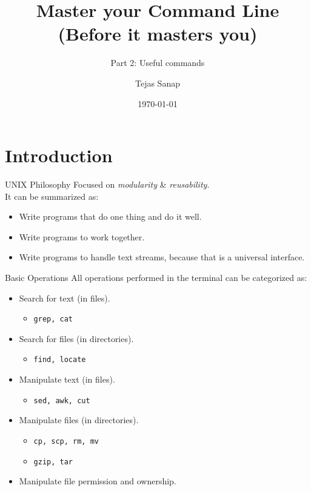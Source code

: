 \documentclass[11pt]{beamer}
\title[PLUG Meetup]{Master your Command Line \\ \small{(Before it masters you)} }
\subtitle{\large{Part 2: Useful commands}}
\author{Tejas Sanap}
\date{\today}
\begin{document}
	\begin{frame}
		\titlepage
	\end{frame}
	\begin{frame}
		\tableofcontents
	\end{frame}

	\section{Introduction}
		\begin{frame}{UNIX Philosophy}
			Focused on \emph{modularity} \& \emph{reusability}. \\
			It can be summarized as:
			\begin{itemize}
				\item Write programs that do one thing and do it well.
				\item Write programs to work together.
				\item Write programs to handle text streams, because that is a universal interface.
			\end{itemize}
		\end{frame}

		\begin{frame}{Basic Operations}
			All operations performed in the terminal can be categorized as:
			\begin{itemize}
				\item Search for text (in files).
					\begin{itemize}
						\item \texttt{grep, cat}
					\end{itemize}
				\item Search for files (in directories).
					\begin{itemize}
						\item \texttt{find, locate}
					\end{itemize}
				\item Manipulate text (in files).
					\begin{itemize}
						\item \texttt{sed, awk, cut}
					\end{itemize}
				\item Manipulate files (in directories).
					\begin{itemize}
						\item \texttt{cp, scp, rm, mv}
						\item \texttt{gzip, tar}
					\end{itemize}
				\item Manipulate file permission and ownership.
			\end{itemize}			
		\end{frame}
\end{document}
